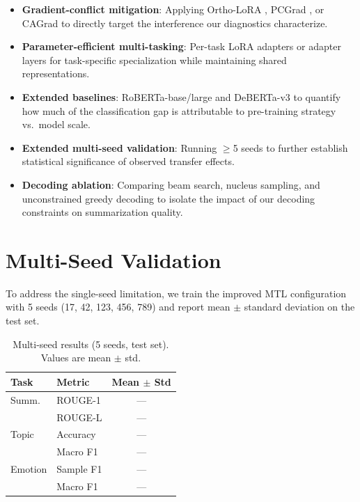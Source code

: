 \documentclass[11pt]{article}
\begin{document}
\begin{itemize}
    \item \textbf{Gradient-conflict mitigation}: Applying Ortho-LoRA \citep{ortholora2025}, PCGrad \citep{yu2020gradient}, or CAGrad \citep{liu2021conflict} to directly target the interference our diagnostics characterize.

    \item \textbf{Parameter-efficient multi-tasking}: Per-task LoRA adapters \citep{hu2022lora} or adapter layers \citep{houlsby2019parameter} for task-specific specialization while maintaining shared representations.

    \item \textbf{Extended baselines}: RoBERTa-base/large and DeBERTa-v3 to quantify how much of the classification gap is attributable to pre-training strategy vs.\ model scale.

    \item \textbf{Extended multi-seed validation}: Running $\geq$5 seeds to further establish statistical significance of observed transfer effects.

    \item \textbf{Decoding ablation}: Comparing beam search, nucleus sampling, and unconstrained greedy decoding to isolate the impact of our decoding constraints on summarization quality.
\end{itemize}

\section{Multi-Seed Validation}
\label{sec:multiseed}

To address the single-seed limitation, we train the improved MTL configuration with 5 seeds (17, 42, 123, 456, 789) and report mean $\pm$ standard deviation on the test set.

\begin{table}[t]
\centering
\caption{Multi-seed results (5 seeds, test set). Values are mean $\pm$ std.}
\label{tab:multiseed}
\small
\setlength{\tabcolsep}{4pt}
\begin{tabular}{llc}
\toprule
\textbf{Task} & \textbf{Metric} & \textbf{Mean $\pm$ Std} \\
\midrule
Summ. & ROUGE-1 & --- \\
 & ROUGE-L & --- \\
\midrule
Topic & Accuracy & --- \\
 & Macro F1 & --- \\
\midrule
Emotion & Sample F1 & --- \\
 & Macro F1 & --- \\
\bottomrule
\end{tabular}
\end{table}

\end{document}
